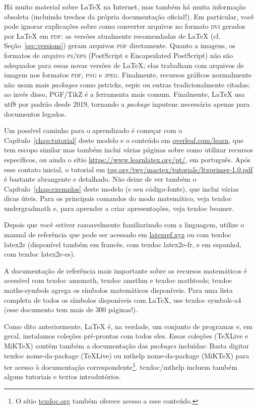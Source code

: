 Há muito material sobre \LaTeX{} na Internet, mas também há muita informação
obsoleta (incluindo trechos da própria documentação oficial!). Em particular,
você pode ignorar explicações sobre como converter arquivos no formato
\textsc{dvi} gerados por \LaTeX{} em \textsc{pdf}: as versões atualmente
recomendadas de \LaTeX{} (cf. Seção~\ref{sec:versions}) geram arquivos
\textsc{pdf} diretamente. Quanto a imagens, os formatos de arquivo
\textsc{ps/eps} (PostScript e Encapsulated PostScript) não são adequados
para essas novas versões de \LaTeX{}; elas trabalham com arquivos de imagem
nos formatos \textsc{pdf}, \textsc{png} e \textsc{jpeg}. Finalmente,
recursos gráficos normalmente não usam mais \textit{packages} como
\textsf{pstricks}, \textsf{eepic} ou outras tradicionalmente citadas;
ao invés disso, \textsf{PGF/TikZ} é a ferramenta mais comum. Finalmente,
\LaTeX{} usa \textsf{utf8} por padrão desde 2019, tornando a \textit{package}
\textsf{inputenc} necessária apenas para documentos legados.

Um possível caminho para o aprendizado é começar com o
Capítulo~\ref{chap:tutorial} deste modelo e o conteúdo em
\url{overleaf.com/learn}, que tem escopo similar mas também inclui
várias páginas sobre como utilizar recursos específicos, ou ainda
o sítio \url{https://www.learnlatex.org/pt/}, em português. Após esse contato
inicial, o tutorial em \url{tug.org/twg/mactex/tutorials/ltxprimer-1.0.pdf}
é bastante abrangente e detalhado. Não deixe de ver também o
Capítulo~\ref{chap:exemplos} deste modelo (e seu código-fonte), que
inclui várias dicas úteis. Para os principais comandos do modo matemático,
veja \textsf{texdoc undergradmath} e, para aprender a criar apresentações,
veja \textsf{texdoc beamer}.

Depois que você estiver razoavelmente familiarizado com a linguagem,
utilize o manual de referência que pode ser acessado em \url{latexref.xyz}
ou com \textsf{texdoc latex2e} (disponível também em francês, com
\textsf{texdoc latex2e-fr}, e em espanhol, com \textsf{texdoc latex2e-es}).

A documentação de referência mais importante sobre os recursos matemáticos
é acessível com \textsf{texdoc amsmath}, \textsf{texdoc amsthm} e
\textsf{texdoc mathtools}; \textsf{texdoc maths-symbols} agrega os símbolos
matemáticos disponíveis. Para uma lista completa de todos os símbolos
disponíveis com \LaTeX{}, use \textsf{texdoc symbols-a4} (esse documento
tem mais de 300 páginas!).

Como dito anteriormente, \LaTeX{} é, na verdade, um conjunto de programas
e, em geral, instalamos coleções pré-prontas com todos eles. Essas coleções
(\TeX{}Live e MiK\TeX{}) contêm também a documentação das \textit{packages}
incluídas: Basta digitar \textsf{texdoc nome-da-package} (\TeX{}Live) ou
\textsf{mthelp nome-da-package} (MiK\TeX{}) para ter acesso à documentação
correspondente\footnote{O sítio \url{texdoc.org} também oferece acesso a
esse conteúdo.}. \textsf{texdoc/mthelp} incluem também alguns tutoriais e
textos introdutórios.

